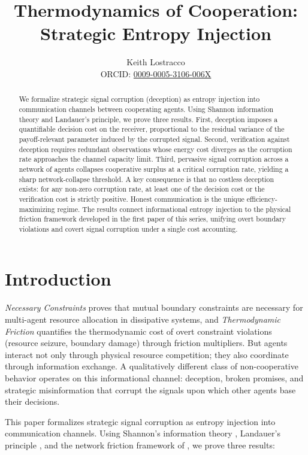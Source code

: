 \documentclass[11pt]{article}
\title{Thermodynamics of Cooperation: Strategic Entropy Injection}
\author{%
Keith Lostracco%
\\[0.25em]{\normalsize ORCID: \href{https://orcid.org/0009-0005-3106-006X}{0009-0005-3106-006X}}%
}
\date{}
\theoremstyle{plain}
\theoremstyle{definition}
\theoremstyle{remark}
\let\origsection\section
\renewcommand{\section}{\needspace{12\baselineskip}\origsection}
\begin{document}
\maketitle

\begin{abstract}
We formalize strategic signal corruption (deception) as entropy
injection into communication channels between cooperating agents. Using
Shannon information theory and Landauer's principle, we prove three
results. First, deception imposes a quantifiable decision cost on the
receiver, proportional to the residual variance of the payoff-relevant
parameter induced by the corrupted signal. Second, verification against
deception requires redundant observations whose energy cost diverges as
the corruption rate approaches the channel capacity limit. Third,
pervasive signal corruption across a network of agents collapses
cooperative surplus at a critical corruption rate, yielding a sharp
network-collapse threshold. A key consequence is that no costless
deception exists: for any non-zero corruption rate, at least one of the
decision cost or the verification cost is strictly positive. Honest
communication is the unique efficiency-maximizing regime. The results
connect informational entropy injection to the physical friction
framework developed in the first paper of this series, unifying overt
boundary violations and covert signal corruption under a single cost
accounting.
\end{abstract}
\section{Introduction}\label{introduction}

\emph{Necessary Constraints} \citep{TC-I} proves that mutual boundary
constraints are necessary for multi-agent resource allocation in
dissipative systems, and \emph{Thermodynamic Friction} \citep{TC-IV}
quantifies the thermodynamic cost of overt constraint violations
(resource seizure, boundary damage) through friction multipliers. But
agents interact not only through physical resource competition; they
also coordinate through information exchange. A qualitatively different
class of non-cooperative behavior operates on this informational
channel: deception, broken promises, and strategic misinformation that
corrupt the signals upon which other agents base their decisions.

This paper formalizes strategic signal corruption as entropy injection
into communication channels. Using Shannon's information theory
\citep{Shannon1948}, Landauer's principle \citep{Landauer1961}, and the
network friction framework of \citep{TC-IV}, we prove three results:
\end{document}
